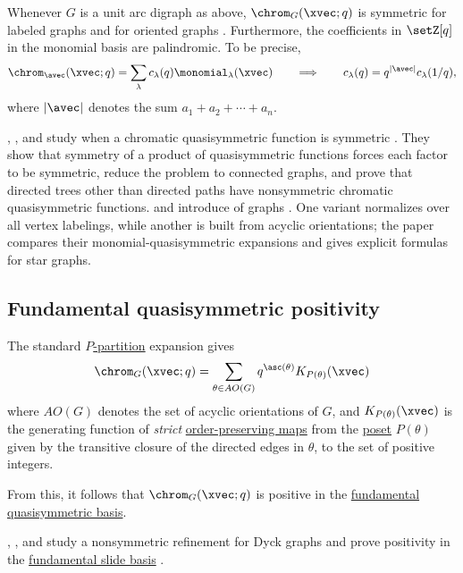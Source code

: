Whenever $G$ is a unit arc digraph as above, $\chrom_G(\xvec;q)$ is symmetric
for labeled graphs \cite{ShareshianWachs2012,ShareshianWachs2016} and for
oriented graphs \cite{Ellzey2017,AlexanderssonPanova2018}.
Furthermore, the coefficients in $\setZ[q]$ in the monomial basis are palindromic.
To be precise,
\[
\chrom_\avec(\xvec;q)=\sum_\lambda c_\lambda(q) \monomial_\lambda(\xvec) \qquad \Longrightarrow \qquad
c_\lambda(q) = q^{|\avec|}c_\lambda(1/q),
\]
where $|\avec|$ denotes the sum $a_1+a_2+\dotsb + a_n$.

, , and  study when
a chromatic quasisymmetric function is symmetric \cite{GillespiePappeSalois2024x}.
They show that symmetry of a product of quasisymmetric functions forces each
factor to be symmetric, reduce the problem to connected graphs, and prove that
directed trees other than directed paths have nonsymmetric chromatic
quasisymmetric functions.
 and  introduce
\label{totalChromaticQuasisymmetricFunction}
of graphs \cite{ColmenarejoKlein2026x}.  One variant normalizes over all
vertex labelings, while another is built from acyclic orientations; the paper
compares their monomial-quasisymmetric expansions and gives explicit formulas
for star graphs.


\subsection[chromaticQuasisymmetricGesselExpansion]{Fundamental quasisymmetric positivity}

The standard \hyperref[pPartition]{$P$-partition} expansion gives
\[
\chrom_G(\xvec;q) = \sum_{\theta \in AO(G)} q^{\asc(\theta)} K_{P(\theta)}(\xvec)
\]
where $AO(G)$ denotes the set of acyclic orientations of $G$, and
$K_{P(\theta)}(\xvec)$ is the generating function
of \emph{strict} \hyperref[pPartition]{order-preserving maps}
from the \hyperref[posets]{poset} $P(\theta)$ given by the transitive closure
of the directed edges in $\theta$,
to the set of positive integers.

From this, it follows that $\chrom_G(\xvec;q)$ is
positive in the \hyperref[gessel]{fundamental quasisymmetric basis}.

, , and  study a
nonsymmetric refinement for Dyck graphs and prove positivity in the
\hyperref[slideF]{fundamental slide basis} \cite{TewariWilsonZhang2022}.


